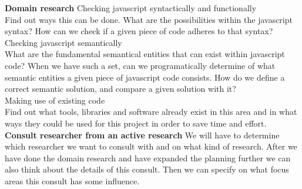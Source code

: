 \documentclass{article}
\begin{document}
\noindent
\textbf{Domain research}
\newline
Checking javascript syntactically and functionally\\
Find out ways this can be done. What are the possibilities within the javascript syntax? How can we check if a given piece of code adheres to that syntax?\\
Checking javascript semantically\\
What are the fundamental semantical entities that can exist within javascript code? When we have such a set, can we programatically determine of what semantic entities a given piece of javascript code consists. How do we define a correct semantic solution, and compare a given solution with it?\\
Making use of existing code\\
Find out what tools, libraries and software already exist in this area and in what ways they could be used for this project in order to save time and effort.\\

\noindent
\textbf{Consult researcher from an active research}
\newline
We will have to determine which researcher we want to consult with and on what kind of research. After we have done the domain research and have expanded the planning further we can also think about the details of this consult. Then we can specify on what focus areas this consult has some influence.\\
\newline
\end{document}
